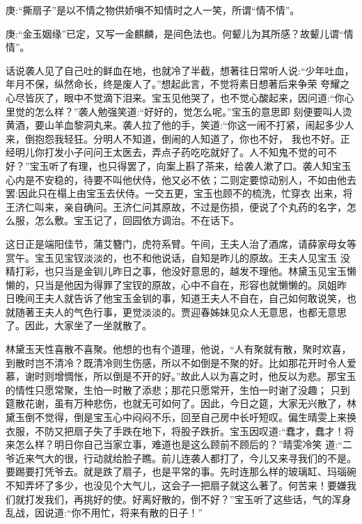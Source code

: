 

\begin{parag}
    \begin{note}庚:“撕扇子”是以不情之物供娇嗔不知情时之人一笑，所谓“情不情”。\end{note}
\end{parag}


\begin{parag}
    \begin{note}庚:“金玉姻缘”已定，又写一金麒麟，是间色法也。何颦儿为其所感？故颦儿谓“情情”。\end{note}
\end{parag}


\begin{parag}
    话说袭人见了自己吐的鲜血在地，也就冷了半截，想著往日常听人说:“少年吐血，年月不保，纵然命长，终是废人了。”想起此言，不觉将素日想著后来争荣 夸耀之心尽皆灰了，眼中不觉滴下泪来。宝玉见他哭了，也不觉心酸起来，因问道:“你心里觉的怎么样？”袭人勉强笑道:“好好的，觉怎么呢。”宝玉的意思即 刻便要叫人烫黄酒，要山羊血黎洞丸来。袭人拉了他的手，笑道:“你这一闹不打紧，闹起多少人来，倒抱怨我轻狂。分明人不知道，倒闹的人知道了，你也不好， 我也不好。正经明儿你打发小子问问王太医去，弄点子药吃吃就好了。人不知鬼不觉的可不好？”宝玉听了有理，也只得罢了，向案上斟了茶来，给袭人漱了口。袭人知宝玉心内是不安稳的，待要不叫他伏侍，他又必不依；二则定要惊动别人，不如由他去罢:因此只在榻上由宝玉去伏侍。一交五更，宝玉也顾不的梳洗，忙穿衣 出来，将王济仁叫来，亲自确问。王济仁问其原故，不过是伤损，便说了个丸药的名字，怎么服，怎么敷。宝玉记了，回园依方调治。不在话下。
\end{parag}


\begin{parag}
    这日正是端阳佳节，蒲艾簪门，虎符系臂。午间，王夫人治了酒席，请薛家母女等赏午。宝玉见宝钗淡淡的，也不和他说话，自知是昨儿的原故。王夫人见宝玉 没精打彩，也只当是金钏儿昨日之事，他没好意思的，越发不理他。林黛玉见宝玉懒懒的，只当是他因为得罪了宝钗的原故，心中不自在，形容也就懒懒的。凤姐昨 日晚间王夫人就告诉了他宝玉金钏的事，知道王夫人不自在，自己如何敢说笑，也就随著王夫人的气色行事，更觉淡淡的。贾迎春姊妹见众人无意思，也都无意思了。因此，大家坐了一坐就散了。
\end{parag}


\begin{parag}
    林黛玉天性喜散不喜聚。他想的也有个道理，他说，“人有聚就有散，聚时欢喜，到散时岂不清冷？既清冷则生伤感，所以不如倒是不聚的好。比如那花开时令人爱慕，谢时则增惆怅，所以倒是不开的好。”故此人以为喜之时，他反以为悲。那宝玉的情性只愿常聚，生怕一时散了添悲；那花只愿常开，生怕一时谢了没趣； 只到筵散花谢，虽有万种悲伤，也就无可如何了。因此，今日之筵，大家无兴散了，林黛玉倒不觉得，倒是宝玉心中闷闷不乐，回至自己房中长吁短叹。偏生晴雯上来换衣服，不防又把扇子失了手跌在地下，将股子跌折。宝玉因叹道:“蠢才，蠢才！将来怎么样？明日你自己当家立事，难道也是这么顾前不顾后的？”晴雯冷笑 道:“二爷近来气大的很，行动就给脸子瞧。前儿连袭人都打了，今儿又来寻我们的不是。要踢要打凭爷去。就是跌了扇子，也是平常的事。先时连那么样的玻璃缸、玛瑙碗不知弄坏了多少，也没见个大气儿，这会子一把扇子就这么著了。何苦来！要嫌我们就打发我们，再挑好的使。好离好散的，倒不好？”宝玉听了这些话，气的浑身乱战，因说道:“你不用忙，将来有散的日子！”
\end{parag}


